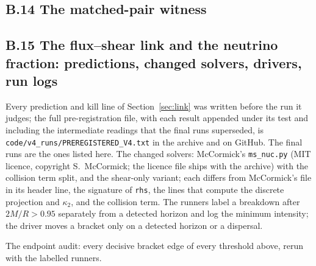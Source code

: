 \documentclass[11pt]{article}
\begin{document}
\subsection*{B.14 The matched-pair witness}








\subsection*{B.15 The flux--shear link and the neutrino fraction: predictions, changed solvers, drivers, run logs}
Every prediction and kill line of Section~\ref{sec:link} was written before the run it judges; the full pre-registration file, with each result appended under its test and including the intermediate readings that the final runs superseded, is \texttt{code/v4\_runs/PREREGISTERED\_V4.txt} in the archive and on GitHub. The final runs are the ones listed here. The changed solvers: McCormick's \texttt{ms\_nuc.py} (MIT licence, copyright S.~McCormick; the licence file ships with the archive) with the collision term split, and the shear-only variant; each differs from McCormick's file in its header line, the signature of \texttt{rhs}, the lines that compute the discrete projection and $\kappa_2$, and the collision term. The runners label a breakdown after $2M/R>0.95$ separately from a detected horizon and log the minimum intensity; the driver moves a bracket only on a detected horizon or a dispersal.






























The endpoint audit: every decisive bracket edge of every threshold above, rerun with the labelled runners.

\end{document}
